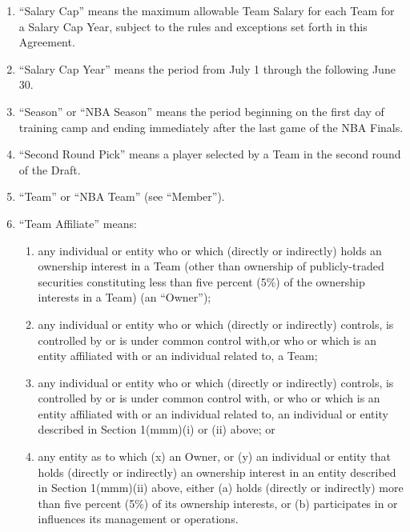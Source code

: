 \documentclass[
]{book}
\providecommand{\tightlist}{%
  \setlength{\itemsep}{0pt}\setlength{\parskip}{0pt}}
\begin{document}
\begin{enumerate}
\item
  ``Salary Cap'' means the maximum allowable Team Salary for each Team for a Salary Cap Year, subject to the rules and exceptions set forth in this Agreement.
\item
  ``Salary Cap Year'' means the period from July 1 through the following June 30.
\item
  ``Season'' or ``NBA Season'' means the period beginning on the first day of training camp and ending immediately after the last game of the NBA Finals.
\item
  ``Second Round Pick'' means a player selected by a Team in the second round of the Draft.
\item
  ``Team'' or ``NBA Team'' (see ``Member'').
\item
  ``Team Affiliate'' means:

  \begin{enumerate}
  \def\labelenumii{(\roman{enumii})}
  \tightlist
  \item
    any individual or entity who or which (directly or indirectly) holds an ownership interest in a Team (other than ownership of publicly-traded securities constituting less than five percent (5\%) of the ownership interests in a Team) (an ``Owner'');
  \item
    any individual or entity who or which (directly or indirectly) controls, is controlled by or is under common control with,or who or which is an entity affiliated with or an individual related to, a Team;
  \item
    any individual or entity who or which (directly or indirectly) controls, is controlled by or is under common control with, or who or which is an entity affiliated with or an individual related to, an individual or entity described in Section 1(mmm)(i) or (ii) above; or
  \item
    any entity as to which (x) an Owner, or (y) an individual or entity that holds (directly or indirectly) an ownership interest in an entity described in Section 1(mmm)(ii) above, either (a) holds (directly or indirectly) more than five percent (5\%) of its ownership interests, or (b) participates in or influences its management or operations.
  \end{enumerate}


\end{enumerate}
\end{document}
